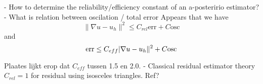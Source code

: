 
- How to determine the reliability/efficiency constant of an a-posteririo estimator?
- What is relation between oscilation / total error
Appears that we have
\[
  \|\nabla{u - u_h}\|^2 \leq C_{rel}\text{err}  + C \text{osc}
\]
and
\[
  \text{err} \leq C_{eff} \\|\nabla{u - u_h}\|^2  + C\text{osc}
\]

Plaates lijkt erop dat $C_{eff}$ tussen 1.5 en 2.0.
- Classical residual estimator theory
$C_{rel} = 1$ for residual using isosceles triangles. Ref?
